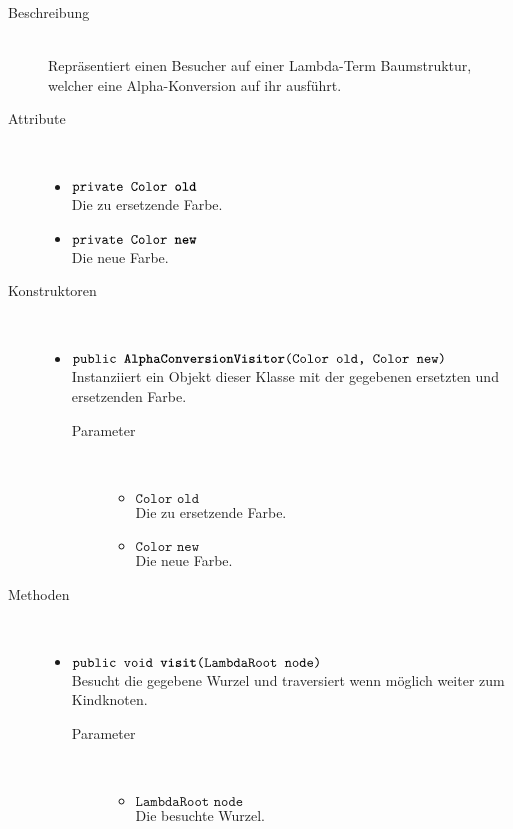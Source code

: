 \begin{description}
\item[Beschreibung] \hfill \\ Repräsentiert einen Besucher auf einer Lambda-Term Baumstruktur, welcher eine Alpha-Konversion auf ihr ausführt.

\item[Attribute] \hfill \\
	\vspace{-.8cm}
	\begin{itemize}
		\item $\texttt{private Color \textbf{old}}$ \\ Die zu ersetzende Farbe.
		\item $\texttt{private Color \textbf{new}}$ \\ Die neue Farbe.
	\end{itemize}

\item[Konstruktoren] \hfill \\
	\vspace{-.8cm}
	\begin{itemize}
		\item $\texttt{public \textbf{AlphaConversionVisitor}(Color old, Color new)}$ \\ Instanziiert ein Objekt dieser Klasse mit der gegebenen ersetzten und ersetzenden Farbe.
		\begin{description}
			\item[Parameter] \hfill \\
			\vspace{-.8cm}
			\begin{itemize}
				\item $\texttt{Color old}$ \\ Die zu ersetzende Farbe.
				\item $\texttt{Color new}$ \\ Die neue Farbe.
			\end{itemize}
		\end{description}
	\end{itemize}

\item[Methoden] \hfill \\
	\vspace{-.8cm}
	\begin{itemize}
		\item $\texttt{public void \textbf{visit}(LambdaRoot node)}$ \\ Besucht die gegebene Wurzel und traversiert wenn möglich weiter zum Kindknoten.
		\begin{description}
			\item[Parameter] \hfill \\
			\vspace{-.8cm}
			\begin{itemize}
				\item $\texttt{LambdaRoot node}$ \\ Die besuchte Wurzel.
			\end{itemize}
		\end{description}
			

\end{itemize}
\end{description}

